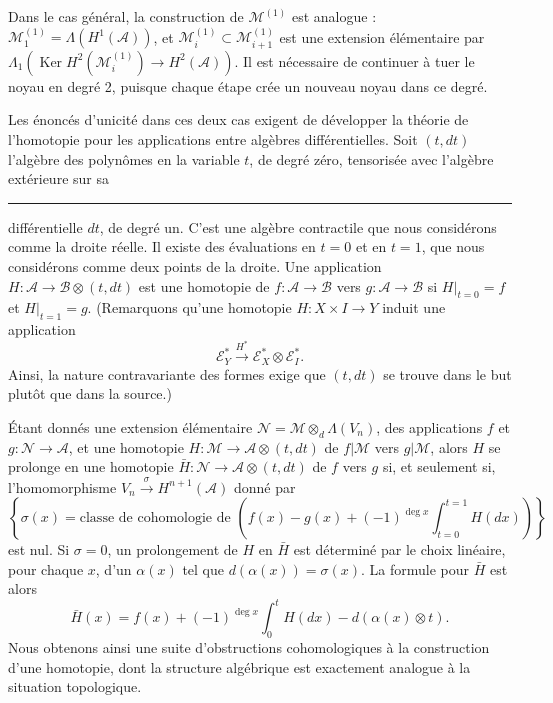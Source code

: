 \documentclass[
  french,
  a3paper,
  a3paper]{extarticle}
\begin{document}
Dans le cas général, la construction de \(\mathcal M^{(1)}\) est
analogue : \(\mathcal M_1^{(1)}=\Lambda(H^1(\mathscr A))\), et
\(\mathcal M_i^{(1)}\subset\mathcal M_{i+1}^{(1)}\) est une extension
élémentaire par
\(\Lambda_1(\operatorname{Ker}H^2(\mathcal M_i^{(1)})\to H^2(\mathscr A))\).
Il est nécessaire de continuer à tuer le noyau en degré 2, puisque
chaque étape crée un nouveau noyau dans ce degré.

Les énoncés d'unicité dans ces deux cas exigent de développer la théorie
de l'homotopie pour les applications entre algèbres différentielles.
Soit \((t,dt)\) l'algèbre des polynômes en la variable \(t\), de degré
zéro, tensorisée avec l'algèbre extérieure sur sa

\clearpage



\par

\vspace{0.7mm}\hrule\vspace{1.6mm}

\fontsize{9}{11}\selectfont

différentielle \(dt\), de degré un. C'est une algèbre contractile que
nous considérons comme la droite réelle. Il existe des évaluations en
\(t=0\) et en \(t=1\), que nous considérons comme deux points de la
droite. Une application \(H:\mathscr A\to\mathscr B\otimes(t,dt)\) est
une homotopie de \(f:\mathscr A\to\mathscr B\) vers
\(g:\mathscr A\to\mathscr B\) si \(H|_{t=0}=f\) et \(H|_{t=1}=g\).
(Remarquons qu'une homotopie \(H:X\times I\to Y\) induit une application
\[
\mathscr E_Y^*\xrightarrow{H^*}\mathscr E_X^*\otimes\mathscr E_I^*.
\] Ainsi, la nature contravariante des formes exige que \((t,dt)\) se
trouve dans le but plutôt que dans la source.)

Étant donnés une extension élémentaire
\(\mathcal N=\mathcal M\otimes_d\Lambda(V_n)\), des applications \(f\)
et \(g:\mathcal N\to\mathscr A\), et une homotopie
\(H:\mathcal M\to\mathscr A\otimes(t,dt)\) de \(f|\mathcal M\) vers
\(g|\mathcal M\), alors \(H\) se prolonge en une homotopie
\(\bar H:\mathcal N\to\mathscr A\otimes(t,dt)\) de \(f\) vers \(g\) si,
et seulement si, l'homomorphisme
\(V_n\xrightarrow{\sigma}H^{n+1}(\mathscr A)\) donné par \[
\left\{\sigma(x)=\text{classe de cohomologie de }\left(f(x)-g(x)+(-1)^{\deg x}\int_{t=0}^{t=1}H(dx)\right)\right\}
\] est nul. Si \(\sigma=0\), un prolongement de \(H\) en \(\bar H\) est
déterminé par le choix linéaire, pour chaque \(x\), d'un \(\alpha(x)\)
tel que \(d(\alpha(x))=\sigma(x)\). La formule pour \(\bar H\) est alors
\[
\bar H(x)=f(x)+(-1)^{\deg x}\int_0^tH(dx)-d(\alpha(x)\otimes t).
\] Nous obtenons ainsi une suite d'obstructions cohomologiques à la
construction d'une homotopie, dont la structure algébrique est
exactement analogue à la situation topologique.
\end{document}
